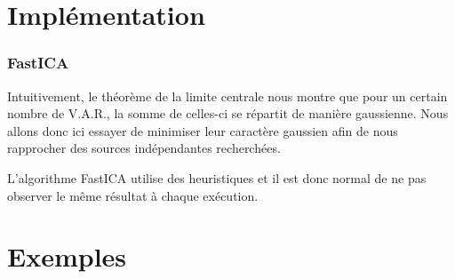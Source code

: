 \documentclass[compress]{beamer}
\begin{document}
\section{Implémentation}
\begin{frame}
	\frametitle{FastICA}
	Intuitivement, le théorème de la limite centrale nous montre que pour un
	certain nombre de V.A.R., la somme de celles-ci se répartit de manière
	gaussienne. Nous allons donc ici essayer de minimiser leur caractère
	gaussien afin de nous rapprocher des sources indépendantes recherchées.
	\pause

	L'algorithme FastICA utilise des heuristiques et il est donc normal
	de ne pas observer le même résultat à chaque exécution.
	
\end{frame}


\section{Exemples}
\end{document}
